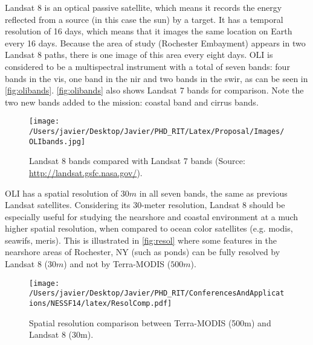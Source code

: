 Landsat 8 is an optical passive satellite, which means it records the energy reflected from a source (in this case the sun) by a target. It has a temporal resolution of 16 days, which means that it images the same location on Earth every 16 days. Because the area of study (Rochester Embayment) appears in two Landsat 8 paths, there is one image of this area every eight days. OLI is considered to be a multispectral instrument with a total of seven bands: four bands in the \gls{vis}, one band in the \acrfull{nir} and two bands in the \acrfull{swir}, as can be seen in \autoref{fig:olibands}. \autoref{fig:olibands} also shows Landsat 7 bands for comparison. Note the two new bands added to the mission: coastal band and cirrus bands.

\begin{figure}[htb]
\centering
      \texttt{[image: /Users/javier/Desktop/Javier/PHD\_RIT/Latex/Proposal/Images/OLIbands.jpg]}
      \caption{Landsat 8 bands compared with Landsat 7 bands (Source: \protect\url{http://landsat.gsfc.nasa.gov/}).}
      \label{fig:olibands}
\end{figure}

OLI has a spatial resolution of $30m$ in all seven bands, the same as previous Landsat satellites. Considering its 30-meter resolution, Landsat 8 should be especially useful for studying the nearshore and coastal environment at a much higher spatial resolution, when compared to ocean color satellites (e.g. \gls{modis}, \gls{seawifs}, \gls{meris}). This is illustrated in \autoref{fig:resol} where some features in the nearshore areas of Rochester, NY (such as ponds) can be fully resolved by Landsat 8 ($30m$) and not by Terra-MODIS ($500m$).

\begin{figure}[htb]
  \centering
  \texttt{[image: /Users/javier/Desktop/Javier/PHD\_RIT/ConferencesAndApplications/NESSF14/latex/ResolComp.pdf]}
  \caption{Spatial resolution comparison between Terra-MODIS (500m) and Landsat 8 (30m). \label{fig:resol} } 
\end{figure}

